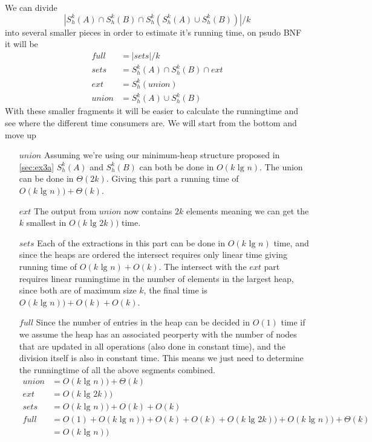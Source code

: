 We can divide
\[
|S^{k}_{h}(A) \cap S^{k}_{h}(B) \cap S^{k}_{h}(S^{k}_{h}(A) \cup S^{k}_{h}(B))|
/ k
\]
%
into several smaller pieces in order to estimate it's running time, on psudo BNF
it will be
\begin{align*}
  full  &= |sets| / k \\
  sets  &= S^{k}_{h}(A) \cap S^{k}_{h}(B) \cap ext \\
  ext   &= S^{k}_{h}(union) \\
  union &= S^{k}_{h}(A) \cup S^{k}_{h}(B)
\end{align*}
With these smaller fragments it will be easier to calculate the runningtime and
see where the different time consumers are. We will start from the bottom and
move up
\begin{itemize}
\item[$union$] Assuming we're using our minimum-heap structure proposed in
  \ref{sec:ex3a} $S^{k}_{h}(A)$ and $S^{k}_{h}(B)$ can both be done in $O(k
  \text{ lg } n)$. The union can be done in $\Theta(2k)$. Giving this part a
  running time of $O(k \text{ lg } n)) + \Theta(k)$.
%
\item[$ext$] The output from $union$ now contains $2k$ elements meaning we can
  get the $k$ smallest in $O(k \text{ lg } 2k))$ time.
%
\item[$sets$] Each of the extractions in this part can be done in $O(k \text{ lg
  } n)$ time, and since the heaps are ordered the intersect requires only linear
  time giving running time of $O(k \text{ lg } n) + O(k)$. The intersect with
  the $ext$ part requires linear runningtime in the number of elements in the
  largest heap, since both are of maximum size $k$, the final time is $O(k
  \text{ lg } n)) + O(k) + O(k)$.
%
\item[$full$] Since the number of entries in the heap can be decided in $O(1)$
  time if we assume the heap has an associated peorperty with the number of
  nodes that are updated in all operations (also done in constant time), and the
  division itself is also in constant time. This means we just need to determine
  the runningtime of all the above segments combined.
\begin{align*}
  union &= O(k \text{ lg } n)) + \Theta(k) \\
  ext   &= O(k \text{ lg } 2k)) \\
  sets  &= O(k \text{ lg } n)) + O(k) + O(k) \\
  full  &= O(1) + O(k \text{ lg } n)) + O(k) + O(k) + O(k \text{ lg } 2k)) + O(k \text{ lg } n)) + \Theta(k) \\
        &= O(k \text{ lg } n))
\end{align*}
\end{itemize}
